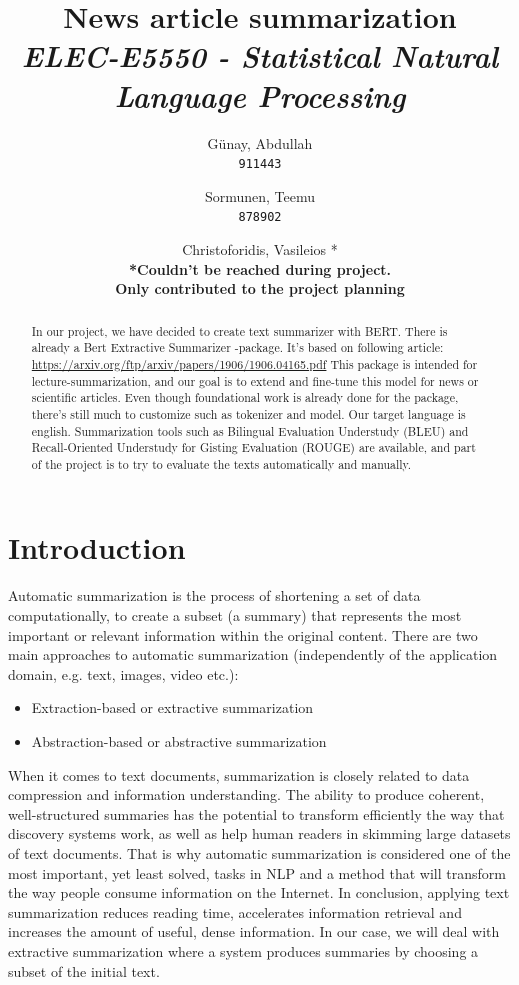 \documentclass{article}
\title{\textbf{News article summarization}\\
\textit{ELEC-E5550 - Statistical Natural Language Processing}}
\author{
  Günay, Abdullah\\
  \texttt{911443}
  \and
  Sormunen, Teemu\\
  \texttt{878902}
  \and
  Christoforidis, Vasileios *\\
  \textbf{*Couldn't be reached during project.\\ Only contributed to the project planning}
}
\begin{document}
	
\maketitle

\begin{abstract}
	\noindent
	In our project, we have decided to create text summarizer with BERT. 
	There is already a Bert Extractive Summarizer -package. It's based on following article: \href{https://arxiv.org/ftp/arxiv/papers/1906/1906.04165.pdf}{https://arxiv.org/ftp/arxiv/papers/1906/1906.04165.pdf}
	This package is intended for lecture-summarization, and our goal is to extend and fine-tune this model for news or scientific articles.
	Even though foundational work is already done for the package, there's still much to customize such as tokenizer and model. 
	Our target language is english. Summarization tools such as Bilingual Evaluation Understudy (BLEU) and Recall-Oriented Understudy for Gisting Evaluation (ROUGE) are available, and part of the project is to try to evaluate the texts automatically and manually.	
\end{abstract}

\clearpage
\section{Introduction}

Automatic summarization is the process of shortening a set of data computationally, to create a subset (a summary) that represents the most important or relevant information within the original content. There are two main approaches to automatic summarization (independently of the application domain, e.g. text, images, video etc.):
\begin{itemize}
	\item Extraction-based or extractive summarization 
	\item Abstraction-based or abstractive summarization
\end{itemize}

When it comes to text documents, summarization is closely related to data compression and information understanding. The ability to produce coherent, well-structured summaries has the potential to transform efficiently the way that discovery systems work, as well as help human readers in skimming large datasets of text documents. That is why automatic summarization is considered one of the most important, yet least solved, tasks in NLP and a method that will transform the way people consume information on the Internet. In conclusion, applying text summarization reduces reading time, accelerates information retrieval and increases the amount of useful, dense information. In our case, we will deal with extractive summarization where a system produces summaries by choosing a subset of the initial text.
\end{document}
